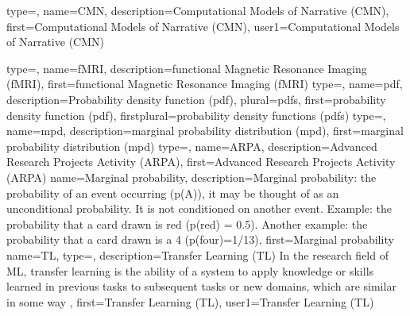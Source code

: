 {
  type=\acronymtype,
  name=CMN,
  description={Computational Models of Narrative (CMN)},
  first={Computational Models of Narrative (CMN)},
  user1={Computational Models of Narrative (CMN)}
}

{
  type=\acronymtype,
  name=fMRI,
  description={functional Magnetic Resonance Imaging (fMRI)},
  first={functional Magnetic Resonance Imaging (fMRI)}
}
{
  type=\acronymtype,
  name=pdf,
  description={Probability density function (pdf)},
  plural={pdfs},
  first={probability density function (pdf)},
  firstplural={probability density functions (pdfs)}
}
{
  type=\acronymtype,
  name=mpd,
  description={marginal probability distribution (mpd)},
  first={marginal probability distribution (mpd)}
}
{
  type=\acronymtype,
  name=ARPA,
  description={Advanced Research Projects Activity (ARPA)},
  first={Advanced Research Projects Activity (ARPA)}
}
{
  name=Marginal probability,
  description={Marginal probability: the probability of an event occurring (p(A)), it may be thought of as an unconditional probability.  It is not conditioned on another event.  Example:  the probability that a card drawn is red (p(red) = 0.5).  Another example:  the probability that a card drawn is a 4 (p(four)=1/13)},
  first={Marginal probability}
}
{
  name=TL,
  type=\acronymtype,
  description={Transfer Learning (TL) In the research field of \gls{ML}, transfer learning is the ability of a system to apply knowledge or skills learned in previous tasks to subsequent tasks or new domains, which are similar in some way \citep{pan2010survey}},
  first={Transfer Learning (TL)},
  user1={Transfer Learning (TL)}
}

